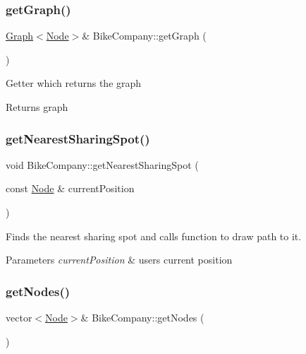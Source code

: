 \subsubsection{\texorpdfstring{get\+Graph()}{getGraph()}}
{\footnotesize\ttfamily \mbox{\hyperlink{class_graph}{Graph}}$<$\mbox{\hyperlink{class_node}{Node}}$>$\& Bike\+Company\+::get\+Graph (\begin{DoxyParamCaption}{ }\end{DoxyParamCaption})\hspace{0.3cm}{\ttfamily [inline]}}

Getter which returns the graph \begin{DoxyReturn}{Returns}
graph 
\end{DoxyReturn}
\mbox{\label{class_bike_company_ae7994d9db29de7064da710915662bd0b}} 
\subsubsection{\texorpdfstring{get\+Nearest\+Sharing\+Spot()}{getNearestSharingSpot()}}
{\footnotesize\ttfamily void Bike\+Company\+::get\+Nearest\+Sharing\+Spot (\begin{DoxyParamCaption}\item[{const \mbox{\hyperlink{class_node}{Node}} \&}]{current\+Position }\end{DoxyParamCaption})}

Finds the nearest sharing spot and calls function to draw path to it. 
\begin{DoxyParams}{Parameters}
{\em current\+Position} & user\textquotesingle{}s current position \\
\hline
\end{DoxyParams}
\mbox{\label{class_bike_company_ae41458919c4daf896b12960c2b43d51c}} 
\subsubsection{\texorpdfstring{get\+Nodes()}{getNodes()}}
{\footnotesize\ttfamily vector$<$\mbox{\hyperlink{class_node}{Node}}$>$\& Bike\+Company\+::get\+Nodes (\begin{DoxyParamCaption}{ }\end{DoxyParamCaption})\hspace{0.3cm}{\ttfamily [inline]}}

